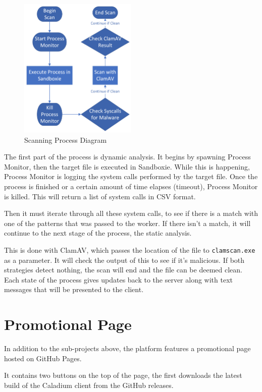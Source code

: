 \begin{figure}[h!]
    \centering
    \includegraphics[width=0.5\textwidth]{images/diagrams/scan_process}
    \caption{Scanning Process Diagram}
    \label{image:scanningProcess}
\end{figure}

The first part of the process is dynamic analysis.
It begins by spawning Process Monitor,
then the target file is executed in Sandboxie.
While this is happening,
Process Monitor is logging the system calls performed by the target file.
Once the process is finished or a certain amount of time elapses (timeout),
Process Monitor is killed. This will return a list of system calls in CSV format.

Then it must iterate through all these system calls,
to see if there is a match with one of the patterns
that was passed to the worker.
If there isn't a match, it will continue to the next stage of the process,
the static analysis.

This is done with ClamAV,
which passes the location of the file to
\texttt{clamscan.exe} as a parameter.
It will check the output of this to see if it's malicious.
If both strategies detect nothing,
the scan will end and the file can be deemed clean.
Each state of the process gives updates back to the server along with
text messages that will be presented to the client.

\section{Promotional Page}
In addition to the sub-projects above, the platform
features a promotional page hosted on GitHub Pages.

It contains two buttons on the top of the page,
the first downloads the latest build of the
Caladium client from the GitHub releases.

